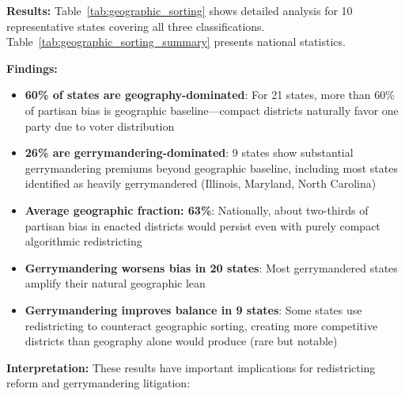 \textbf{Results:} Table~\ref{tab:geographic_sorting} shows detailed analysis for 10 representative states covering all three classifications. Table~\ref{tab:geographic_sorting_summary} presents national statistics.




\textbf{Findings:}
\begin{itemize}
    \item \textbf{60\% of states are geography-dominated}: For 21 states, more than 60\% of partisan bias is geographic baseline—compact districts naturally favor one party due to voter distribution
    \item \textbf{26\% are gerrymandering-dominated}: 9 states show substantial gerrymandering premiums beyond geographic baseline, including most states identified as heavily gerrymandered (Illinois, Maryland, North Carolina)
    \item \textbf{Average geographic fraction: 63\%}: Nationally, about two-thirds of partisan bias in enacted districts would persist even with purely compact algorithmic redistricting
    \item \textbf{Gerrymandering worsens bias in 20 states}: Most gerrymandered states amplify their natural geographic lean
    \item \textbf{Gerrymandering improves balance in 9 states}: Some states use redistricting to counteract geographic sorting, creating more competitive districts than geography alone would produce (rare but notable)
\end{itemize}

\textbf{Interpretation:} These results have important implications for redistricting reform and gerrymandering litigation:

